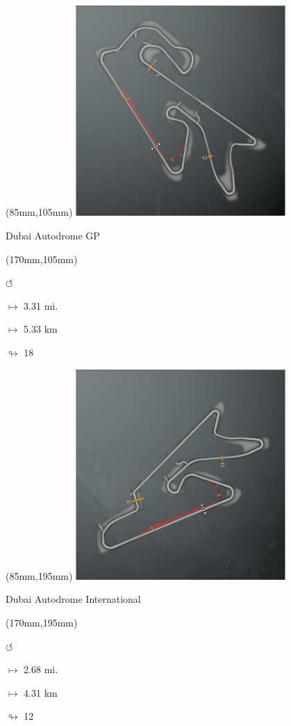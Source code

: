 \begin{textblock*}{80mm}(85mm,105mm)%
\includegraphics[width=80mm]{TR/2015-05-20_00024.png}
\centerline{Dubai Autodrome GP}
\end{textblock*}
\begin{textblock*}{30mm}(170mm,105mm)%
\par \Huge$\circlearrowleft$
\Large
\par$\mapsto$ 3.31 mi.
\par$\mapsto$ 5.33 km
\par$\looparrowright$ 18
\end{textblock*}
\begin{textblock*}{80mm}(85mm,195mm)%
\includegraphics[width=80mm]{TR/2015-05-20_00026.png}
\centerline{Dubai Autodrome International}
\end{textblock*}
\begin{textblock*}{30mm}(170mm,195mm)%
\par \Huge$\circlearrowleft$
\Large
\par$\mapsto$ 2.68 mi.
\par$\mapsto$ 4.31 km
\par$\looparrowright$ 12
\end{textblock*}
\null\newpage

